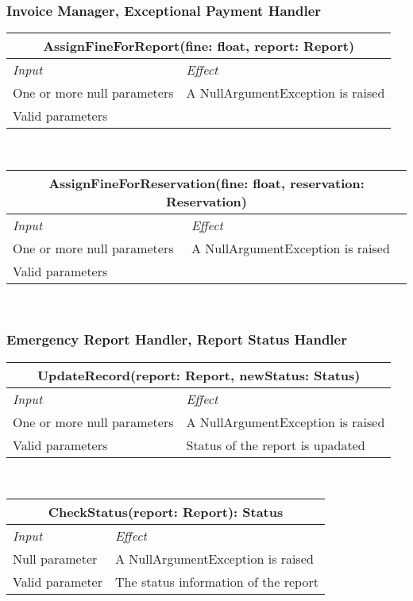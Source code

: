 		\subsubsection*{Invoice Manager, Exceptional Payment Handler}
			\begin{tabular}{ |l|l| }
				\hline
				\multicolumn{2}{|c|}{AssignFineForReport(fine: float, report: Report)}\\
				\hline 
				\textit{Input}&\textit{Effect}\\ \hline
				One or more null parameters & A NullArgumentException is raised\\ \hline
				Valid parameters & %
				\\ \hline
			\end{tabular}
			\\
			\begin{tabular}{ |l|l| }
				\hline
				\multicolumn{2}{|c|}{AssignFineForReservation(fine: float, reservation: Reservation)}\\
				\hline 
				\textit{Input}&\textit{Effect}\\ \hline
				One or more null parameters & A NullArgumentException is raised\\ \hline
				Valid parameters & %
				\\ \hline
			\end{tabular}
			\\	
			
		\subsubsection*{Emergency Report Handler, Report Status Handler}
			\begin{tabular}{ |l|l| }
				\hline
				\multicolumn{2}{|c|}{UpdateRecord(report: Report, newStatus: Status)}\\
				\hline
				\textit{Input} & \textit{Effect}\\ \hline
				One or more null parameters & A NullArgumentException is raised\\ \hline
				Valid parameters & Status of the report is upadated \\ \hline
			\end{tabular}
			\\
			\begin{tabular}{ |l|l| }
				\hline
				\multicolumn{2}{|c|}{CheckStatus(report: Report): Status}\\
				\hline
				\textit{Input} & \textit{Effect}\\ \hline
				Null parameter & A NullArgumentException is raised\\ \hline
				Valid parameter & The status information of the report\\ \hline
			\end{tabular}
			\\	
					
					
			
			